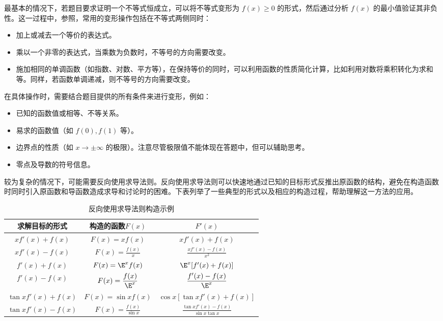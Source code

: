 最基本的情况下，若题目要求证明一个不等式恒成立，可以将不等式变形为 $f(x) \geq 0$ 的形式，然后通过分析 $f(x)$ 的最小值验证其非负性。这一过程中，参照，常用的变形操作包括在不等式两侧同时：

\begin{itemize}
\item 加上或减去一个等价的表达式。
\item 乘以一个非零的表达式，当乘数为负数时，不等号的方向需要改变。
\item 施加相同的单调函数（如指数、对数、平方等），在保持等价的同时，可以利用函数的性质简化计算，比如利用对数将乘积转化为求和等。同样，若函数单调递减，则不等号的方向需要改变。
\end{itemize}

在具体操作时，需要结合题目提供的所有条件来进行变形，例如：
\begin{itemize}
\item 已知的函数值或相等、不等关系。
\item 易求的函数值（如 $f(0), f(1)$ 等）。
\item 边界点的性质（如 $x \to \pm \infty$ 的极限）。注意尽管极限值不能体现在答题中，但可以辅助思考。
\item 零点及导数的符号信息。
\end{itemize}

较为复杂的情况下，可能需要反向使用求导法则。反向使用求导法则可以快速地通过已知的目标形式反推出原函数的结构，避免在构造函数时同时引入原函数和导函数造成求导和讨论时的困难。下表列举了一些典型的形式以及相应的构造过程，帮助理解这一方法的应用。

\begin{table}[ht]
\centering
\caption{反向使用求导法则构造示例}\label{tab_HsDerC1}
\begin{tabular}{|c|c|c|}
\hline
求解目标的形式 &构造的函数$F(x)$& $F'(x)$ \\
\hline
$x f'(x) + f(x)$ & $F(x) = x f(x)$ & $x f'(x) + f(x)$ \\
\hline
$xf'(x) - f(x)$ & $\displaystyle F(x) = \frac{f(x)}{x}$& $\displaystyle\frac{xf'(x)- f(x)}{x^2}$ \\
\hline
$f'(x) + f(x)$ & $F(x) = \E^x f(x)$ & $\E^x [f'(x) + f(x)]$ \\
\hline
$f'(x) - f(x)$ & $\displaystyle F(x) = \frac{f(x)}{\E^x}$& $\displaystyle\frac{f'(x) - f(x)}{\E^x}$ \\
\hline
$\tan xf'(x) + f(x)$ & $F(x) = \sin x f(x)$ & $\cos x [\tan xf'(x) + f(x)]$ \\
\hline
$\tan xf'(x) - f(x)$ & $\displaystyle F(x) = \frac{f(x)}{\sin x}$ & $\displaystyle\frac{\tan xf'(x) - f(x)}{\sin x\tan x}$ \\
\hline
\end{tabular}
\end{table}

